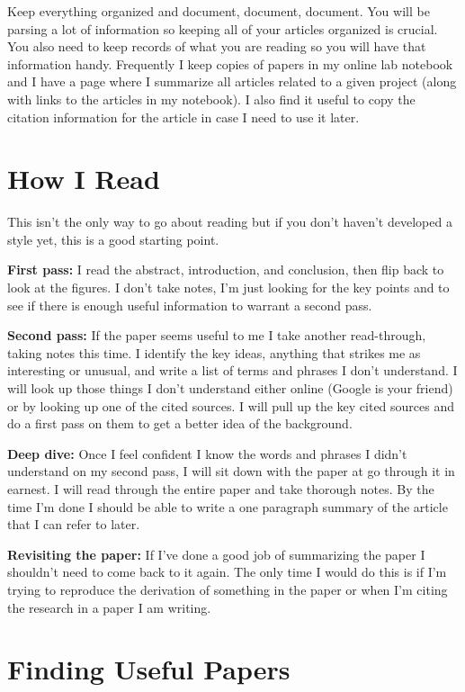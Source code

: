 \documentclass[12pt, letterpaper]{article}
\begin{document}
Keep everything organized and document, document, document.  You will be parsing a lot of information so keeping all of your articles organized is crucial.  You also need to keep records of what you are reading so you will have that information handy.  Frequently I keep copies of papers in my online lab notebook and I have a page where I summarize all articles related to a given project (along with links to the articles in my notebook).  I also find it useful to copy the citation information for the article in case I need to use it later.

\section*{How I Read}

This isn't the only way to go about reading but if you don't haven't developed a style yet, this is a good starting point.

\textbf{First pass:}  I read the abstract, introduction, and conclusion, then flip back to look at the figures.  I don't take notes, I'm just looking for the key points and to see if there is enough useful information to warrant a second pass.

\textbf{Second pass:} If the paper seems useful to me I take another read-through, taking notes this time.  I identify the key ideas, anything that strikes me as interesting or unusual, and write a list of terms and phrases I don't understand.  I will look up those things I don't understand either online (Google is your friend) or by looking up one of the cited sources.  I will pull up the key cited sources and do a first pass on them to get a better idea of the background.

\textbf{Deep dive:}  Once I feel confident I know the words and phrases I didn't understand on my second pass, I will sit down with the paper at go through it in earnest.  I will read through the entire paper and take thorough notes.  By the time I'm done I should be able to write a one paragraph summary of the article that I can refer to later.

\textbf{Revisiting the paper:}  If I've done a good job of summarizing the paper I shouldn’t need to come back to it again.  The only time I would do this is if I'm trying to reproduce the derivation of something in the paper or when I’m citing the research in a paper I am writing.


\section*{Finding Useful Papers}
\end{document}
